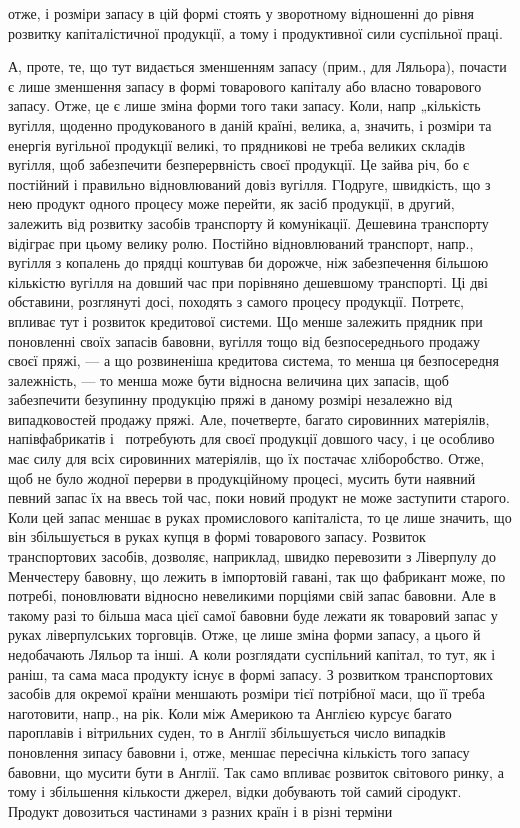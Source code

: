 \parcont{}  %
отже, і розміри запасу в цій формі стоять у зворотному відношенні до
рівня розвитку капіталістичної продукції, а тому і продуктивної сили
суспільної праці.

А, проте, те, що тут видається зменшенням запасу (прим., для Ляльора),
почасти є лише зменшення запасу в формі товарового капіталу або
власно товарового запасу. Отже, це є лише зміна форми того таки запасу.
Коли, напр „кількість вугілля, щоденно продукованого в даній країні,
велика, а, значить, і розміри та енергія вугільної продукції великі, то
прядникові не треба великих складів вугілля, щоб забезпечити безперервність
своєї продукції. Це зайва річ, бо є постійний і правильно
відновлюваний довіз вугілля. ГІодруге, швидкість, що з нею продукт
одного процесу може перейти, як засіб продукції, в другий, залежить
від розвитку засобів транспорту й комунікації. Дешевина транспорту
відіграє при цьому велику ролю. Постійно відновлюваний транспорт,
напр., вугілля з копалень до прядці коштував би дорожче, ніж забезпечення
більшою кількістю вугілля на довший час при порівняно дешевшому
транспорті. Ці дві обставини, розглянуті досі, походять з самого процесу
продукції. Потретє, впливає тут і розвиток кредитової системи. Що менше
залежить прядник при поновленні своїх запасів бавовни, вугілля тощо від
безпосереднього продажу своєї пряжі, — а що розвиненіша кредитова система,
то менша ця безпосередня залежність, — то менша може бути відносна
величина цих запасів, щоб забезпечити безупинну продукцію пряжі
в даному розмірі незалежно від випадковостей продажу пряжі. Але,
почетверте, багато сировинних матеріялів, напівфабрикатів і~ потребують
для своєї продукції довшого часу, і це особливо має силу для
всіх сировинних матеріялів, що їх постачає хліборобство. Отже, щоб не
було жодної перерви в продукційному процесі, мусить бути наявний
певний запас їх на ввесь той час, поки новий продукт не може заступити
старого. Коли цей запас меншає в руках промислового капіталіста,
то це лише значить, що він збільшується в руках купця в
формі товарового запасу. Розвиток транспортових засобів, дозволяє, наприклад,
швидко перевозити з Ліверпулу до Менчестеру бавовну, що
лежить в імпортовій гавані, так що фабрикант може, по потребі, поновлювати
відносно невеликими порціями свій запас бавовни. Але в такому
разі то більша маса цієї самої бавовни буде лежати як товаровий
запас у руках ліверпулських торговців. Отже, це лише зміна форми запасу,
а цього й недобачають Ляльор та інші. А коли розглядати суспільний
капітал, то тут, як і раніш, та сама маса продукту існує в формі
запасу. З розвитком транспортових засобів для окремої країни меншають
розміри тієї потрібної маси, що її треба наготовити, напр., на рік.
Коли між Америкою та Англією курсує багато пароплавів і вітрильних
суден, то в Англії збільшується число випадків поновлення зипасу бавовни
і, отже, меншає пересічна кількість того запасу бавовни, що мусити
бути в Англії. Так само впливає розвиток світового ринку, а
тому і збільшення кількости джерел, відки добувають той самий
сіродукт. Продукт довозиться частинами з разних країн і в різні терміни
\parbreak{}  %
